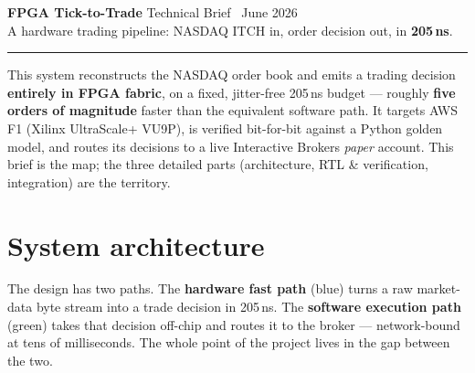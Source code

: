 \documentclass[10pt,a4paper]{article}
\newcommand{\hruleline}{\textcolor{rulegray}{\rule{\linewidth}{1pt}}}
\begin{document}
{\LARGE\bfseries\color{fpgablue} FPGA Tick-to-Trade}\hfill
{\small\color{rulegray} Technical Brief \textbullet\ June 2026}\\[-1pt]
{\large A hardware trading pipeline: NASDAQ ITCH in, order decision out, in \textbf{205\,ns}.}

\hruleline

\vspace{-2pt}
This system reconstructs the NASDAQ order book and emits a trading decision
\textbf{entirely in FPGA fabric}, on a fixed, jitter-free 205\,ns budget --- roughly
\textbf{five orders of magnitude} faster than the equivalent software path. It targets
AWS F1 (Xilinx UltraScale+ VU9P), is verified bit-for-bit against a Python golden model,
and routes its decisions to a live Interactive Brokers \emph{paper} account. This brief
is the map; the three detailed parts (architecture, RTL \& verification, integration)
are the territory.

\section{System architecture}

The design has two paths. The \textbf{hardware fast path} (blue) turns a raw market-data
byte stream into a trade decision in 205\,ns. The \textbf{software execution path} (green)
takes that decision off-chip and routes it to the broker --- network-bound at tens of
milliseconds. The whole point of the project lives in the gap between the two.
\end{document}
